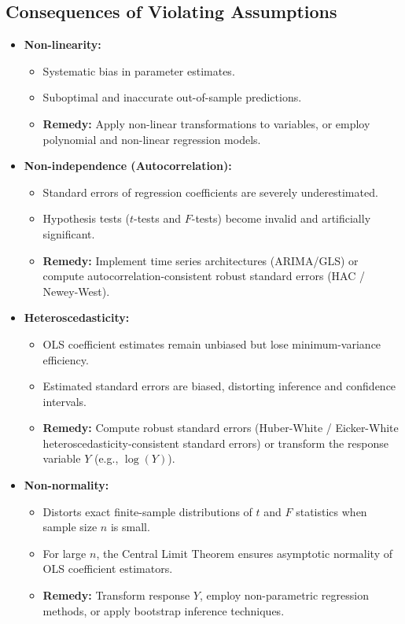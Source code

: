 \subsection{Consequences of Violating Assumptions}

\begin{itemize}
	\item \textbf{Non-linearity:}
	\begin{itemize}
		\item Systematic bias in parameter estimates.
		\item Suboptimal and inaccurate out-of-sample predictions.
		\item \textbf{Remedy:} Apply non-linear transformations to variables, or employ polynomial and non-linear regression models.
	\end{itemize}
	
	\item \textbf{Non-independence (Autocorrelation):}
	\begin{itemize}
		\item Standard errors of regression coefficients are severely underestimated.
		\item Hypothesis tests ($t$-tests and $F$-tests) become invalid and artificially significant.
		\item \textbf{Remedy:} Implement time series architectures (ARIMA/GLS) or compute autocorrelation-consistent robust standard errors (HAC / Newey-West).
	\end{itemize}
	
	\item \textbf{Heteroscedasticity:}
	\begin{itemize}
		\item OLS coefficient estimates remain unbiased but lose minimum-variance efficiency.
		\item Estimated standard errors are biased, distorting inference and confidence intervals.
		\item \textbf{Remedy:} Compute robust standard errors (Huber-White / Eicker-White heteroscedasticity-consistent standard errors) or transform the response variable $Y$ (e.g., $\log(Y)$).
	\end{itemize}
	
	\item \textbf{Non-normality:}
	\begin{itemize}
		\item Distorts exact finite-sample distributions of $t$ and $F$ statistics when sample size $n$ is small.
		\item For large $n$, the Central Limit Theorem ensures asymptotic normality of OLS coefficient estimators.
		\item \textbf{Remedy:} Transform response $Y$, employ non-parametric regression methods, or apply bootstrap inference techniques.
	\end{itemize}
\end{itemize}

